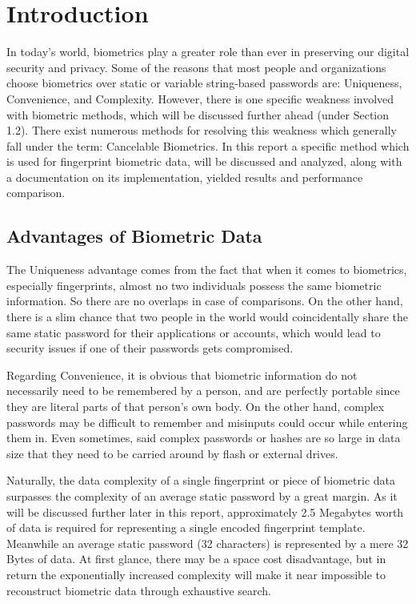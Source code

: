 \documentclass[fyp]{socreport}
\begin{document}
\chapter{Introduction}
In today's world, biometrics play a greater role than ever in preserving our digital security and privacy.  Some of the reasons that most people and organizations choose biometrics over static or variable string-based passwords are: Uniqueness, Convenience, and Complexity. However, there is one specific weakness involved with biometric methods, which will be discussed further ahead (under Section 1.2). There exist numerous methods for resolving this weakness which generally fall under the term: Cancelable Biometrics. In this report a specific method \cite{wencheng18cbio} which is used for fingerprint biometric data, will be discussed and analyzed, along with a documentation on its implementation, yielded results and performance comparison.
\section{Advantages of Biometric Data}
The Uniqueness advantage comes from the fact that when it comes to biometrics, especially fingerprints, almost no two individuals possess the same biometric information. So there are no overlaps in case of comparisons. On the other hand, there is a slim chance that two people in the world would coincidentally share the same static password for their applications or accounts, which would lead to security issues if one of their passwords gets compromised.

Regarding Convenience, it is obvious that biometric information do not necessarily need to be remembered by a person, and are perfectly portable since they are literal parts of that person's own body. On the other hand, complex passwords may be difficult to remember and misinputs could occur while entering them in. Even sometimes, said complex passwords or hashes are so large in data size that they need to be carried around by flash or external drives.

Naturally, the data complexity of a single fingerprint or piece of biometric data surpasses the complexity of an average static password by a great margin. As it will be discussed further later in this report, approximately 2.5 Megabytes worth of data is required for representing a single encoded fingerprint template. Meanwhile an average static password (32 characters) is represented by a mere 32 Bytes of data. At first glance, there may be a space cost disadvantage, but in return the exponentially increased complexity will make it near impossible to reconstruct biometric data through exhaustive search.
\end{document}
